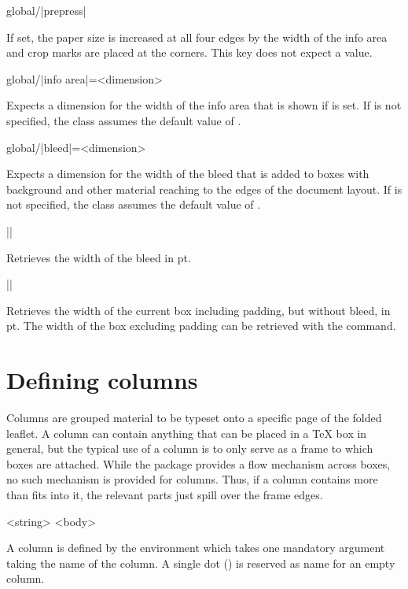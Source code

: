 \documentclass[a4paper]{article}
\begin{document}
\begin{macrodef}
global/|prepress|
\end{macrodef}
If set, the paper size is increased at all four edges by the width of the info area and crop marks are placed at the corners. This key does not expect a value.

\begin{macrodef}
global/|info area|={<dimension>}
\end{macrodef}
Expects a dimension for the width of the info area that is shown if  is set. If  is not specified, the class assumes the default value of \macro{10mm}.

\begin{macrodef}
global/|bleed|={<dimension>}
\end{macrodef}
Expects a dimension for the width of the bleed that is added to boxes with background and other material reaching to the edges of the document layout. If  is not specified, the class assumes the default value of \macro{3mm}.

\begin{macrodef}
|\leporellobleed|
\end{macrodef}
Retrieves the width of the bleed in pt.

\begin{macrodef}
|\leporelloboxwidth|
\end{macrodef}
Retrieves the width of the current box including padding, but without bleed, in pt. The width of the box excluding padding can be retrieved with the \macro{\linewidth} command.

\section{Defining columns}

Columns are grouped material to be typeset onto a specific page of the folded leaflet. A column can contain anything that can be placed in a TeX box in general, but the typical use of a column is to only serve as a frame to which boxes are attached. While the package provides a flow mechanism across boxes, no such mechanism is provided for columns. Thus, if a column contains more than fits into it, the relevant parts just spill over the frame edges.

\begin{macrodef}
\null\begin{|leporellocolumn|}{<string>}
  <body>
\end{|leporellocolumn|}
\end{macrodef}
A column is defined by the  environment which takes one mandatory argument taking the name of the column. A single dot () is reserved as name for an empty column.
\end{document}
